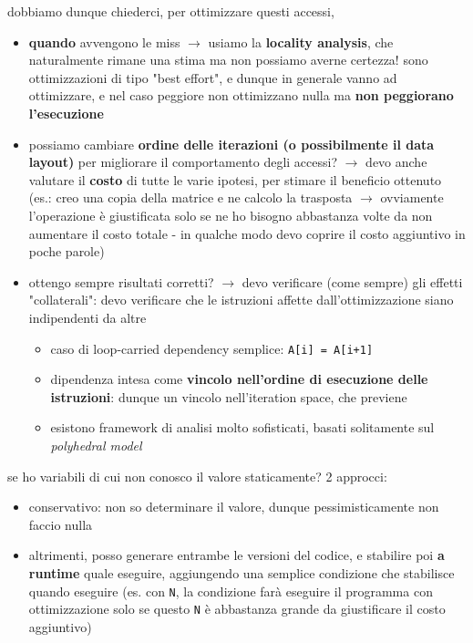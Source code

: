 dobbiamo dunque chiederci, per ottimizzare questi accessi, 
\begin{itemize}
  \item \textbf{quando} avvengono le miss $\rightarrow$ usiamo la \textbf{locality analysis}, che naturalmente rimane una stima ma non possiamo averne certezza! sono ottimizzazioni di tipo "best effort", e dunque in generale vanno ad ottimizzare, e nel caso peggiore non ottimizzano nulla ma \textbf{non peggiorano l'esecuzione}
  \item possiamo cambiare \textbf{ordine delle iterazioni (o possibilmente il data layout)} per migliorare il comportamento degli accessi? $\rightarrow$ devo anche valutare il \textbf{costo} di tutte le varie ipotesi, per stimare il beneficio ottenuto (es.: creo una copia della matrice e ne calcolo la trasposta $\rightarrow$ ovviamente l'operazione \`e giustificata solo se ne ho bisogno abbastanza volte da non aumentare il costo totale - in qualche modo devo coprire il costo aggiuntivo in poche parole)
  \item ottengo sempre risultati corretti? $\rightarrow$ devo verificare (come sempre) gli effetti "collaterali": devo verificare che le istruzioni affette dall'ottimizzazione siano indipendenti da altre
  \begin{itemize}
    \item caso di loop-carried dependency semplice: \lstinline|A[i] = A[i+1]|
    \item dipendenza intesa come \textbf{vincolo nell'ordine di esecuzione delle istruzioni}: dunque un vincolo nell'iteration space, che previene 
    \item esistono framework di analisi molto sofisticati, basati solitamente sul \textit{polyhedral model}
  \end{itemize}
\end{itemize}

\begin{emphasize}
    se ho variabili di cui non conosco il valore staticamente? 2 approcci:
    \begin{itemize}
      \item conservativo: non so determinare il valore, dunque pessimisticamente non faccio nulla
      \item altrimenti, posso generare entrambe le versioni del codice, e stabilire poi \textbf{a runtime} quale eseguire, aggiungendo una semplice condizione che stabilisce quando eseguire (es. con \lstinline|N|, la condizione far\`a eseguire il programma con ottimizzazione solo se questo \lstinline|N| \`e abbastanza grande da giustificare il costo aggiuntivo)
    \end{itemize}
    
\end{emphasize}

